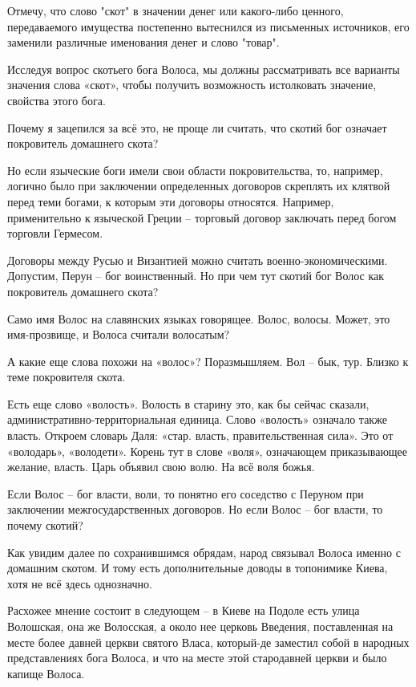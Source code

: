 \documentclass[a5paper,11pt,openany]{article}
\begin{document}
   Отмечу, что слово "скот" в значении денег или какого-либо ценного, передаваемого имущества постепенно вытеснился из письменных источников, его заменили различные именования денег и слово "товар".

   Исследуя вопрос скотьего бога Волоса, мы должны рассматривать все варианты значения слова «скот», чтобы получить возможность истолковать значение, свойства этого бога. 

   Почему я зацепился за всё это, не проще ли считать, что скотий бог означает покровитель домашнего скота?

Но если языческие боги имели свои области покровительства, то, например, логично было при заключении определенных договоров скреплять их клятвой перед теми богами, к которым эти договоры относятся. Например, применительно к языческой Греции – торговый договор заключать перед богом торговли Гермесом.

Договоры между Русью и Византией можно считать военно-экономическими. Допустим, Перун – бог воинственный. Но при чем тут скотий бог Волос как покровитель 
домашнего скота?

Само имя Волос на славянских языках говорящее. Волос, волосы. Может, это имя-прозвище, и Волоса считали волосатым?

А какие еще слова похожи на «волос»? Поразмышляем. Вол – бык, тур. Близко к теме покровителя скота.

Есть еще слово «волость». Волость в старину это, как бы сейчас сказали, административно-территориальная единица. Слово «волость» означало также власть. Откроем словарь Даля: «стар. власть, правительственная сила». Это от «володарь», «володети». Корень тут в слове «воля», означающем приказывающее желание, власть. Царь объявил свою волю. На всё воля божья.

Если Волос – бог власти, воли, то понятно его соседство с Перуном при заключении межгосударственных договоров. Но если Волос – бог власти, то почему скотий?

Как увидим далее по сохранившимся обрядам, народ связывал Волоса именно с домашним скотом. И тому есть дополнительные доводы в топонимике Киева, хотя не всё здесь однозначно.

Расхожее мнение состоит в следующем – в Киеве на Подоле есть улица Волошская, она же Волосская, а около нее церковь Введения, поставленная на месте более давней церкви святого Власа, который-де заместил собой в народных представлениях бога Волоса, и что на месте этой стародавней церкви и было капище Волоса.
\end{document}
